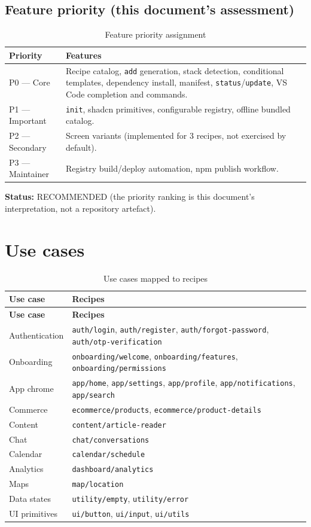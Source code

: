 \subsection*{Feature priority (this document's assessment)}
\begin{table}[H]
\centering
\caption{Feature priority assignment}
\begin{tabular}{@{}L{2.2cm}L{11.6cm}@{}}
\toprule
\textbf{Priority} & \textbf{Features} \\
\midrule
P0 --- Core & Recipe catalog, \texttt{add} generation, stack detection, conditional templates, dependency install, manifest, \texttt{status}/\texttt{update}, VS Code completion and commands. \\
P1 --- Important & \texttt{init}, shadcn primitives, configurable registry, offline bundled catalog. \\
P2 --- Secondary & Screen variants (implemented for 3 recipes, not exercised by default). \\
P3 --- Maintainer & Registry build/deploy automation, npm publish workflow. \\
\bottomrule
\end{tabular}
\end{table}

\textbf{Status:} RECOMMENDED (the priority ranking is this document's
interpretation, not a repository artefact).

\section{Use cases}

\begin{longtable}{@{}L{4.4cm}L{10cm}@{}}
\caption{Use cases mapped to recipes}\\
\toprule
\textbf{Use case} & \textbf{Recipes} \\
\midrule
\endfirsthead
\toprule
\textbf{Use case} & \textbf{Recipes} \\
\midrule
\endhead
Authentication & \texttt{auth/login}, \texttt{auth/register}, \texttt{auth/forgot-password}, \texttt{auth/otp-verification} \\
Onboarding & \texttt{onboarding/welcome}, \texttt{onboarding/features}, \texttt{onboarding/permissions} \\
App chrome & \texttt{app/home}, \texttt{app/settings}, \texttt{app/profile}, \texttt{app/notifications}, \texttt{app/search} \\
Commerce & \texttt{ecommerce/products}, \texttt{ecommerce/product-details} \\
Content & \texttt{content/article-reader} \\
Chat & \texttt{chat/conversations} \\
Calendar & \texttt{calendar/schedule} \\
Analytics & \texttt{dashboard/analytics} \\
Maps & \texttt{map/location} \\
Data states & \texttt{utility/empty}, \texttt{utility/error} \\
UI primitives & \texttt{ui/button}, \texttt{ui/input}, \texttt{ui/utils} \\
\bottomrule
\end{longtable}

